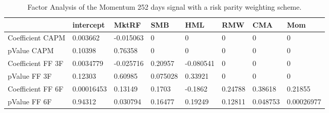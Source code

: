 \begin{table}[H]
\centering
\begin{tabular}{llllllll}
\hline& intercept & MktRF & SMB & HML & RMW & CMA & Mom \\ 
\hline 
Coefficient CAPM & 0.003662 & -0.015063 & 0 & 0 & 0 & 0 & 0 \\ 
pValue CAPM & 0.10398 & 0.76358 & 0 & 0 & 0 & 0 & 0 \\ 
Coefficient FF 3F & 0.0034779 & -0.025716 & 0.20957 & -0.080541 & 0 & 0 & 0 \\ 
pValue FF 3F & 0.12303 & 0.60985 & 0.075028 & 0.33921 & 0 & 0 & 0 \\ 
Coefficient FF 6F & 0.00016453 & 0.13149 & 0.1703 & -0.1862 & 0.24788 & 0.38618 & 0.21855 \\ 
pValue FF 6F & 0.94312 & 0.030794 & 0.16477 & 0.19249 & 0.12811 & 0.048753 & 0.00026977 \\ 
\hline
\end{tabular}
\caption{Factor Analysis of the Momentum 252 days signal with a risk parity weighting scheme.}
\label{MOM252RP_FACTOR}
\end{table}